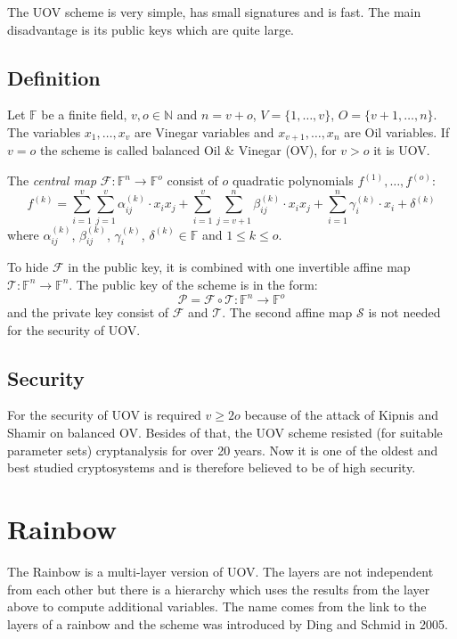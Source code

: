 \documentclass[thesis=M,english]{FITthesis}[2019/12/23]
\begin{document}
\bigskip
\noindent
The UOV scheme is very simple, has small signatures and is fast. The main disadvantage is its public keys which are quite large.

\subsection{Definition}
Let $\mathbb{F}$ be a finite field, $v,o \in \mathbb{N}$ and $n=v+o$, $V=\{1, \ldots, v\}$, $O=\{v+1, \ldots, n\}$. The variables $x_1, \ldots, x_v$ are Vinegar variables and $x_{v+1}, \ldots, x_n$ are Oil variables. If $v=o$ the scheme is called balanced Oil \& Vinegar (OV), for $v>o$ it is UOV.

\bigskip
\noindent
The \textit{central map} $\mathcal{F}:\mathbb{F}^n \rightarrow \mathbb{F}^o$ consist of $o$ quadratic polynomials $f^{(1)}, \ldots, f^{(o)}$:
\[
	f^{(k)} = \sum\limits_{i=1}^{v} {\sum\limits_{j=1}^{v} {\alpha_{ij}^{(k)} \cdot x_ix_j}} +  \sum\limits_{i=1}^{v} {\sum\limits_{j=v+1}^{n} {\beta_{ij}^{(k)} \cdot x_ix_j}}+ \sum\limits_{i=1}^{n} {\gamma_{i}^{(k)} \cdot x_i} + \delta^{(k)}
\]
where $\alpha_{ij}^{(k)}$, $\beta_{ij}^{(k)}$, $\gamma_{i}^{(k)}$, $\delta^{(k)} \in \mathbb{F}$ and $1 \leq k \leq o$.

\bigskip
\noindent
To hide $\mathcal{F}$ in the public key, it is combined with one invertible affine map $\mathcal{T}: \mathbb{F}^n \rightarrow \mathbb{F}^n$. The public key of the scheme is in the form:
\[
	\mathcal{P} = \mathcal{F} \circ \mathcal{T} : \mathbb{F}^n \rightarrow \mathbb{F}^o
\]
and the private key consist of $\mathcal{F}$ and $\mathcal{T}$. The second affine map $\mathcal{S}$ is not needed for the security of UOV.

\subsection{Security}
For the security of UOV is required $v \geq 2o$ because of the attack of Kipnis and Shamir on balanced OV.\cite{L-KS98} Besides of that, the UOV scheme resisted (for suitable parameter sets) cryptanalysis for over 20 years. Now it is one of the oldest and best studied cryptosystems and is therefore believed to be of high security.

\newpage
\section{Rainbow}
The Rainbow is a multi-layer version of UOV. The layers are not independent from each other but there is a hierarchy which uses the results from the layer above to compute additional variables. The name comes from the link to the layers of a rainbow and the scheme was introduced by Ding and Schmid in 2005.
\end{document}
